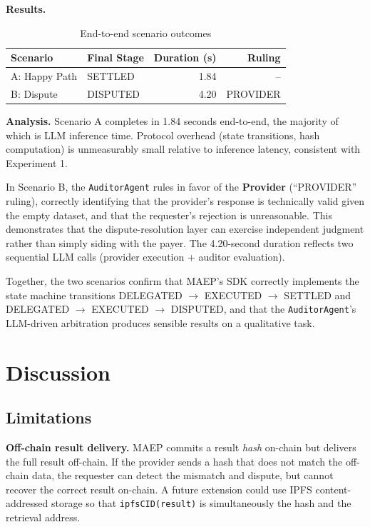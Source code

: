 \documentclass[conference]{IEEEtran}
\begin{document}
\textbf{Results.}

\begin{table}[h]
\caption{End-to-end scenario outcomes}
\label{tab:scenario}
\centering
\begin{tabular}{llrr}
\toprule
\textbf{Scenario} & \textbf{Final Stage} & \textbf{Duration (s)} & \textbf{Ruling} \\
\midrule
A: Happy Path & SETTLED  & 1.84 & -- \\
B: Dispute    & DISPUTED & 4.20 & PROVIDER \\
\bottomrule
\end{tabular}
\end{table}

\textbf{Analysis.}
Scenario A completes in 1.84 seconds end-to-end, the majority of which
is LLM inference time.  Protocol overhead (state transitions, hash
computation) is unmeasurably small relative to inference latency,
consistent with Experiment 1.

In Scenario B, the \texttt{AuditorAgent} rules in favor of the
\textbf{Provider} (``PROVIDER'' ruling), correctly identifying that
the provider's response is technically valid given the empty dataset,
and that the requester's rejection is unreasonable.  This demonstrates
that the dispute-resolution layer can exercise independent judgment
rather than simply siding with the payer.  The 4.20-second duration
reflects two sequential LLM calls (provider execution + auditor
evaluation).

Together, the two scenarios confirm that MAEP's SDK correctly
implements the state machine transitions DELEGATED $\to$ EXECUTED
$\to$ SETTLED and DELEGATED $\to$ EXECUTED $\to$ DISPUTED, and that
the \texttt{AuditorAgent}'s LLM-driven arbitration produces sensible
results on a qualitative task.

\section{Discussion}
\label{sec:discussion}

\subsection{Limitations}

\textbf{Off-chain result delivery.}
MAEP commits a result \emph{hash} on-chain but delivers the full
result off-chain.  If the provider sends a hash that does not match
the off-chain data, the requester can detect the mismatch and dispute,
but cannot recover the correct result on-chain.  A future extension
could use IPFS content-addressed storage so that
\texttt{ipfsCID(result)} is simultaneously the hash and the retrieval
address.
\end{document}
